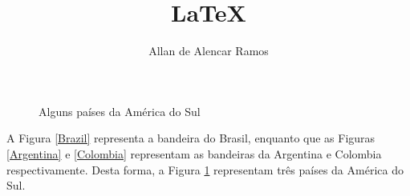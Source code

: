 \documentclass[12pt, a4paper]{article}
\begin{document}
\title{LaTeX}
\author{Allan de Alencar Ramos}
\maketitle

\begin{figure}
\centering
{}
\caption{Alguns países da América do Sul}\label{FigSouthAmerica}
\end{figure}

\vspace{1cm}

A Figura \ref{Brazil} representa a bandeira do Brasil, enquanto que as Figuras \ref{Argentina} e \ref{Colombia} representam as bandeiras da Argentina e Colombia respectivamente. Desta forma, a Figura \ref{FigSouthAmerica} representam três países da América do Sul.
\end{document}
